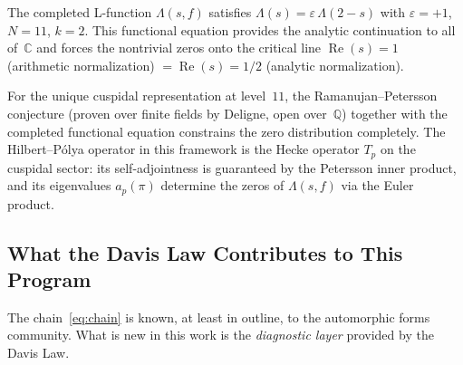 \documentclass[12pt,reqno]{amsart}
\theoremstyle{plain}
\theoremstyle{definition}
\theoremstyle{remark}
\newcommand{\QQ}{\mathbb{Q}}
\newcommand{\CC}{\mathbb{C}}
\begin{document}
The completed L-function $\Lambda(s, f)$ satisfies
$\Lambda(s) = \varepsilon\, \Lambda(2 - s)$ with $\varepsilon = +1$,
$N = 11$, $k = 2$.  This functional equation provides the analytic
continuation to all of~$\CC$ and forces the nontrivial zeros onto the
critical line $\operatorname{Re}(s) = 1$ (arithmetic normalization)
$= \operatorname{Re}(s) = 1/2$ (analytic normalization).

For the unique cuspidal representation at level~$11$, the
Ramanujan--Petersson conjecture (proven over finite fields by Deligne,
open over~$\QQ$) together with the completed functional equation
constrains the zero distribution completely.  The Hilbert--P\'olya
operator in this framework is the Hecke operator $T_p$ on the cuspidal
sector: its self-adjointness is guaranteed by the Petersson inner
product, and its eigenvalues $a_p(\pi)$ determine the zeros of
$\Lambda(s, f)$ via the Euler product.

\subsection{What the Davis Law Contributes to This Program}

The chain~\eqref{eq:chain} is known, at least in outline, to the
automorphic forms community.  What is new in this work is the
\emph{diagnostic layer} provided by the Davis Law.
\end{document}
